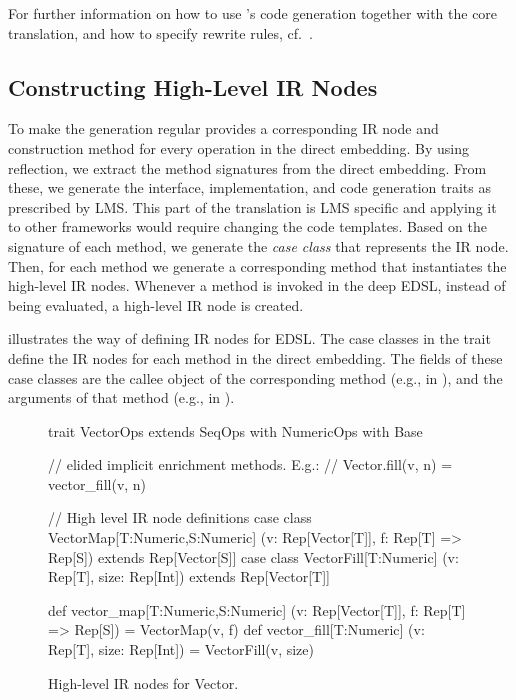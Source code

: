 
For further information on how to use \yy's code generation together
with the core translation, and how to specify rewrite rules,
cf.~\cite{techrep}.

\subsection{Constructing High-Level IR Nodes}
\label{sec:yy-impl-def}

To make the generation regular \yy provides a corresponding IR node and
construction method for every operation in the direct embedding. By using
reflection, we extract the method signatures from the direct embedding. From
these, we generate the interface, implementation, and code generation traits as
prescribed by LMS. This part of the translation is LMS specific and applying it
to other frameworks would require changing the code templates. Based on the
signature of each method, we generate the \emph{case class} that represents the
IR node. Then, for each method we generate a corresponding method that
instantiates the high-level IR nodes. Whenever a method is invoked in the deep
EDSL, instead of being evaluated, a high-level IR node is created.

 illustrates the way of defining IR nodes for
 EDSL. The case classes in the  trait define the
IR nodes for each method in the direct embedding. The fields of these case
classes are the callee object of the corresponding method (e.g.,  in
), and the arguments of that method (e.g.,  in
).

\begin{figure}
\begin{listingtiny}
trait VectorOps extends SeqOps with
  NumericOps with Base {
  // elided implicit enrichment methods. E.g.:
  //   Vector.fill(v, n) = vector_fill(v, n)

  // High level IR node definitions
  case class VectorMap[T:Numeric,S:Numeric]
    (v: Rep[Vector[T]], f: Rep[T] => Rep[S])
    extends Rep[Vector[S]]
  case class VectorFill[T:Numeric]
    (v: Rep[T], size: Rep[Int])
    extends Rep[Vector[T]]

  def vector_map[T:Numeric,S:Numeric]
    (v: Rep[Vector[T]], f: Rep[T] => Rep[S]) =
      VectorMap(v, f)
  def vector_fill[T:Numeric]
    (v: Rep[T], size: Rep[Int]) =
    VectorFill(v, size)
}
\end{listingtiny}
\caption{\label{lst:vector_deep_ir} High-level IR nodes for Vector.}
\end{figure}

